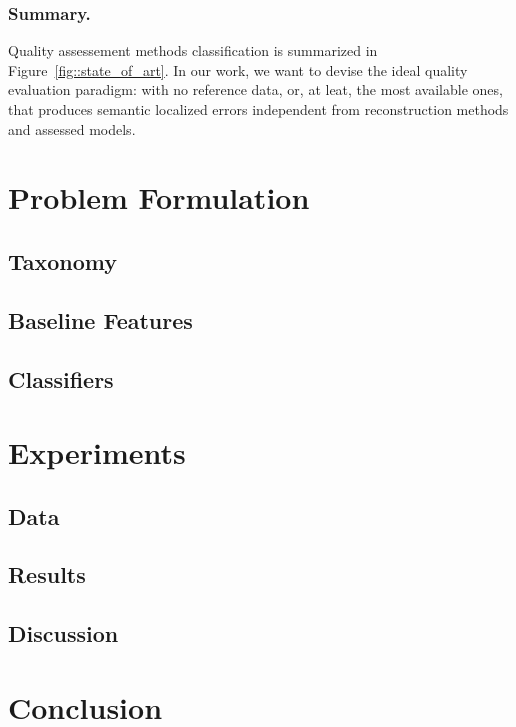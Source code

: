 \documentclass[runningheads]{llncs}
\begin{document}
\subsubsection{Summary.}

Quality assessement methods classification is summarized in Figure~\ref{fig::state_of_art}. In our work, we want to devise the ideal quality evaluation paradigm: with no reference data, or, at leat, the most available ones, that produces semantic localized errors independent from reconstruction methods and assessed models.
\section{Problem Formulation}
\subsection{Taxonomy}
\subsection{Baseline Features}
\subsection{Classifiers}
\section{Experiments}
\subsection{Data}
\subsection{Results}
\subsection{Discussion}
\section{Conclusion}



\end{document}
